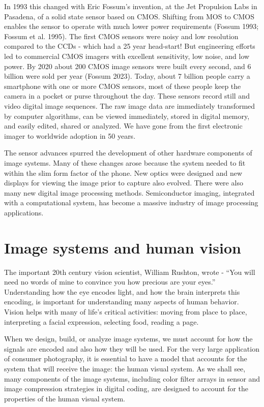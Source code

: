 \documentclass[
  letterpaper,
]{book}
\begin{document}
In 1993 this changed with Eric Fossum's invention, at the Jet Propulsion
Labs in Pasadena, of a solid state sensor based on CMOS. Shifting from
MOS to CMOS enables the sensor to operate with much lower power
requirements (Fossum 1993; Fossum et al. 1995). The first CMOS sensors
were noisy and low resolution compared to the CCDs - which had a 25 year
head-start! But engineering efforts led to commercial CMOS imagers with
excellent sensitivity, low noise, and low power. By 2020 about 200 CMOS
image sensors were built every second, and 6 billion were sold per year
(Fossum 2023). Today, about 7 billion people carry a smartphone with one
or more CMOS sensors, most of these people keep the camera in a pocket
or purse throughout the day. These sensors record still and video
digital image sequences. The raw image data are immediately transformed
by computer algorithms, can be viewed immediately, stored in digital
memory, and easily edited, shared or analyzed. We have gone from the
first electronic imager to worldwide adoption in 50 years.

The sensor advances spurred the development of other hardware components
of image systems. Many of these changes arose because the system needed
to fit within the slim form factor of the phone. New optics were
designed and new displays for viewing the image prior to capture also
evolved. There were also many new digital image processing methods.
Semiconductor imaging, integrated with a computational system, has
become a massive industry of image processing applications.

\section*{Image systems and human
vision}\label{image-systems-and-human-vision}


The important 20th century vision scientist, William Rushton, wrote -
``You will need no words of mine to convince you how precious are your
eyes.'' Understanding how the eye encodes light, and how the brain
interprets this encoding, is important for understanding many aspects of
human behavior. Vision helps with many of life's critical activities:
moving from place to place, interpreting a facial expression, selecting
food, reading a page.

When we design, build, or analyze image systems, we must account for how
the signals are encoded and also how they will be used. For the very
large application of consumer photography, it is essential to have a
model that accounts for the system that will receive the image: the
human visual system. As we shall see, many components of the image
systems, including color filter arrays in sensor and image compression
strategies in digital coding, are designed to account for the properties
of the human visual system.
\end{document}

